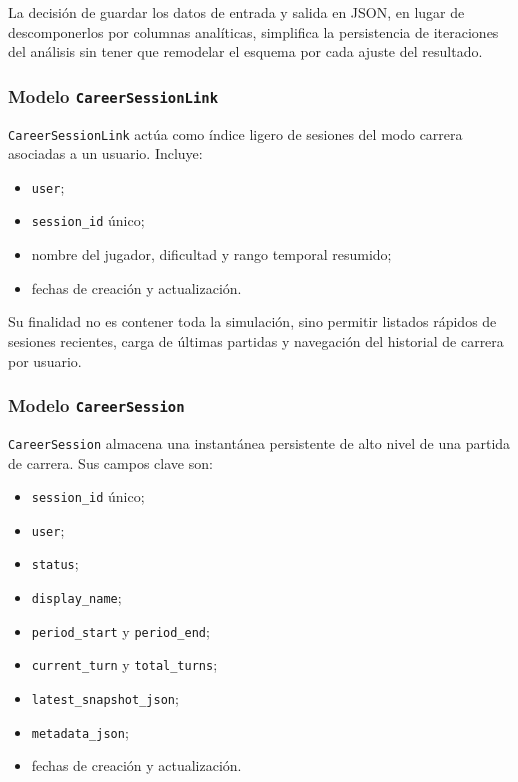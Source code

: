 La decisión de guardar los datos de entrada y salida en JSON, en lugar de descomponerlos por columnas analíticas, simplifica la persistencia de iteraciones del análisis sin tener que remodelar el esquema por cada ajuste del resultado.

\subsubsection{Modelo \texttt{CareerSessionLink}}

\texttt{CareerSessionLink} actúa como índice ligero de sesiones del modo carrera asociadas a un usuario. Incluye:

\begin{itemize}
    \item \texttt{user};
    \item \texttt{session\_id} único;
    \item nombre del jugador, dificultad y rango temporal resumido;
    \item fechas de creación y actualización.
\end{itemize}

Su finalidad no es contener toda la simulación, sino permitir listados rápidos de sesiones recientes, carga de últimas partidas y navegación del historial de carrera por usuario.

\subsubsection{Modelo \texttt{CareerSession}}

\texttt{CareerSession} almacena una instantánea persistente de alto nivel de una partida de carrera. Sus campos clave son:

\begin{itemize}
    \item \texttt{session\_id} único;
    \item \texttt{user};
    \item \texttt{status};
    \item \texttt{display\_name};
    \item \texttt{period\_start} y \texttt{period\_end};
    \item \texttt{current\_turn} y \texttt{total\_turns};
    \item \texttt{latest\_snapshot\_json};
    \item \texttt{metadata\_json};
    \item fechas de creación y actualización.
\end{itemize}

